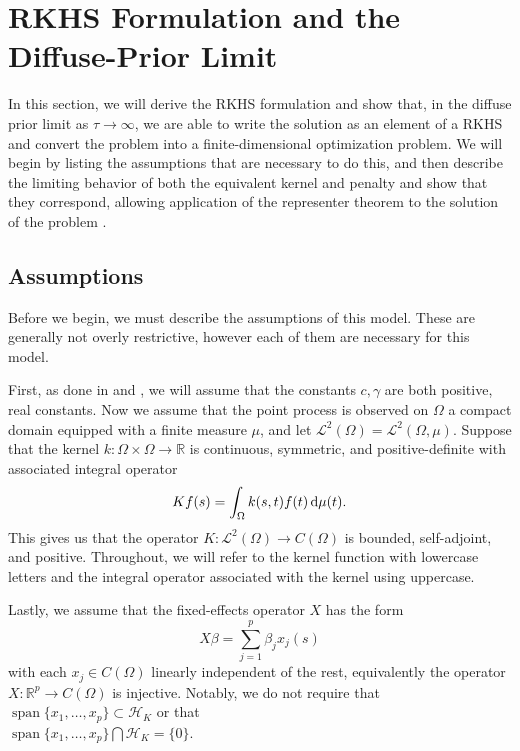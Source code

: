\documentclass[ejsv2,preprint]{imsart}
\newcommand{\diffd}{\textnormal{d}}
\begin{document}


\section{RKHS Formulation and the Diffuse-Prior Limit}

In this section, we will derive the RKHS formulation and show that, in the diffuse prior limit as $\tau\to\infty$, we are able to write the solution as an element of a RKHS and convert the problem into a finite-dimensional optimization problem. We will begin by listing the assumptions that are necessary to do this, and then describe the limiting behavior of both the equivalent kernel and penalty and show that they correspond, allowing application of the representer theorem to the solution of the problem \cite{gen_representer_thm}.
\subsection{Assumptions}

Before we begin, we must describe the assumptions of this model. These are generally not overly restrictive, however each of them are necessary for this model.

First, as done in \cite{pmlr-v54-flaxman17a} and \cite{pmlr-v70-walder17a}, we will assume that the constants $c,\gamma$ are both positive, real constants. Now we assume that the point process is observed on $\Omega$ a compact domain equipped with a finite measure $\mu$, and let
$\mathcal{L}^2(\Omega)=\mathcal{L}^2(\Omega,\mu)$. Suppose that the kernel $k:\Omega\times\Omega\to\mathbb{R}$ is continuous, symmetric, and positive-definite with associated integral operator 
\begin{equation}
        Kf(s)
        =
        \int_{\Omega} k(s,t)f(t)\,\diffd\mu(t).
\end{equation}
This gives us that the operator $K:\mathcal{L}^2(\Omega)\to C(\Omega)$ is bounded, self-adjoint, and positive. Throughout, we will refer to the kernel function with lowercase letters and the integral operator associated with the kernel using uppercase. 

Lastly, we assume that the fixed-effects operator $X$ has the form
\begin{equation}
    X\beta=\sum_{j=1}^p\beta_jx_j(s)
\end{equation}
with each $x_j\in C(\Omega)$ linearly independent of the rest, equivalently the operator $X:\mathbb{R}^p\to C(\Omega)$ is injective. Notably, we do not require that 
$\operatorname{span}\{x_1,\ldots,x_p\}
        \subset \mathcal{H}_K$ or that 
        \\ $\operatorname{span}\{x_1,\ldots,x_p\}
        \bigcap \mathcal{H}_K=\{0\}$.
\end{document}
